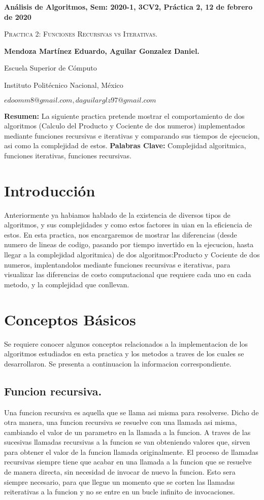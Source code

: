 \documentclass[12pt,twoside]{article}
\date{}
\begin{document}
\centerline{\bf An\'alisis de Algoritmos, Sem: 2020-1, 3CV2, Pr\'actica 2, 12 de febrero de 2020}
\centerline{}
\centerline{}
\begin{center}
\Large{\textsc{Pr\´actica 2: Funciones Recursivas vs Iterativas.}}
\end{center}
\centerline{}
\centerline{\bf {Mendoza Mart\'inez Eduardo, Aguilar Gonzalez Daniel.}}
\centerline{}
\centerline{Escuela Superior de C\'omputo}
\centerline{Instituto Polit\'ecnico Nacional, M\'exico}
\centerline{$edoomm8@gmail.com, daguilarglz97@gmail.com$}
\newtheorem{Theorem}{\quad Theorem}[section]
\newtheorem{Definition}[Theorem]{\quad Definition}
\newtheorem{Corollary}[Theorem]{\quad Corollary}
\newtheorem{Lemma}[Theorem]{\quad Lemma}
\newtheorem{Example}[Theorem]{\quad Example}
\bigskip
\textbf{Resumen:} La siguiente pr\´actica pretende mostrar el comportamiento de dos algoritmos (C\´alculo del Producto y  Cociente de dos n\´umeros) implementados mediante funciones recursivas e iterativas y comparando sus tiempos de ejecuci\´on, as\´i como la complejidad de estos. \newline
{\bf Palabras Clave:} Complejidad algor\´itmica, funciones iterativas, funciones recursivas.
\section{Introducci\'on}
Anteriormente ya hab\´iamos hablado de la existencia de diversos tipos de algoritmos,
y sus complejidades y c\´omo estos factores in
u\´ian en la eficiencia de \´estos.
En esta pr\´actica, nos encargaremos de mostrar las diferencias (desde n\´umero
de l\´ineas de c\´odigo, pasando por tiempo invertido en la ejecuci\´on, hasta llegar
a la complejidad algor\´itmica) de dos algoritmos:Producto y Cociente de dos n\´umeros, implent\´andolos mediante funciones recursivas e iterativas, para visualizar las diferencias de costo computacional que requiere cada uno en cada m\´etodo, y la complejidad que conllevan.
\section{Conceptos B\'asicos}
Se requiere conocer algunos conceptos relacionados
a la implementaci\´on de los algoritmos estudiados en esta pr\´actica y los
m\´etodos a trav\´es de los cuales se desarrollaron. Se presenta a continuaci\´on la informaci\´on correspondiente.
\subsection{Funci\´on recursiva.}
Una funci\´on recursiva es aquella que se llama as\´i misma para resolverse. Dicho de otra manera, una funci\´on recursiva se resuelve con una llamada as\´i misma, cambiando el valor de un par\´ametro en la llamada a la funci\´on. A trav\´es de las sucesivas llamadas recursivas a la funci\´on se van obteniendo valores que, sirven para obtener el valor de la funci\´on llamada originalmente. El proceso de llamadas recursivas siempre tiene que acabar en una llamada a la funci\´on que se resuelve de manera directa, sin necesidad de invocar de nuevo la funci\´on. Esto ser\´a siempre necesario, para que llegue un momento que se corten las llamadas reiterativas a la funci\´on y no se entre en un bucle inf\´inito de invocaciones.
\end{document}
